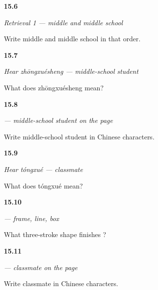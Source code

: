 \noindent\begin{minipage}[t]{\linewidth}
\raggedright
\hypertarget{review-ZH-R15-school-map-1-recall}{\textbf{15.6}} \emph{Retrieval 1 — middle and middle school}\par
\small Write middle and middle school in that order.
\end{minipage}\par\medskip

\noindent\begin{minipage}[t]{\linewidth}
\raggedright
\hypertarget{review-ZH-C15-hear-zhongxuesheng-meaning}{\textbf{15.7}} \emph{Hear \emph{zhōngxuésheng} — middle-school student}\par
\small What does zhōngxuésheng mean?
\end{minipage}\par\medskip

\noindent\begin{minipage}[t]{\linewidth}
\raggedright
\hypertarget{review-ZH-C15-zhongxuesheng-write}{\textbf{15.8}} \emph{ — middle-school student on the page}\par
\small Write middle-school student in Chinese characters.
\end{minipage}\par\medskip

\noindent\begin{minipage}[t]{\linewidth}
\raggedright
\hypertarget{review-ZH-C15-hear-tongxue-meaning}{\textbf{15.9}} \emph{Hear \emph{tóngxué} — classmate}\par
\small What does tóngxué mean?
\end{minipage}\par\medskip

\noindent\begin{minipage}[t]{\linewidth}
\raggedright
\hypertarget{review-ZH-W15-tong-order}{\textbf{15.10}} \emph{ — frame, line, box}\par
\small What three-stroke shape finishes ?
\end{minipage}\par\medskip

\noindent\begin{minipage}[t]{\linewidth}
\raggedright
\hypertarget{review-ZH-C15-tongxue-write}{\textbf{15.11}} \emph{ — classmate on the page}\par
\small Write classmate in Chinese characters.
\end{minipage}\par\medskip

